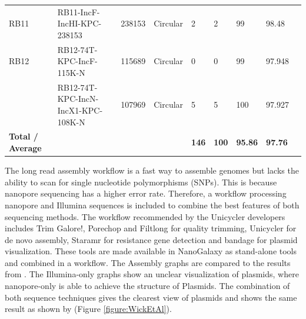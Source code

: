 \documentclass[a4paper,num-refs]{oup-contemporary}
\begin{document}
\begin{landscape}
\begin{table}
\begin{tabular}{l l l l l l l l l}
RB11                     & RB11-IncF-IncHI-KPC-238153         & 238153        & Circular            & 2                                & 2                                        & 99                & 98.48             &                   \\
RB12                     & RB12-74T-KPC-IncF-115K-N           & 115689        & Circular            & 0                                & 0                                        & 99                & 97.948            &                   \\
                         & RB12-74T-KPC-IncN-IncX1-KPC-108K-N & 107969        & Circular            & 5                                & 5                                        & 100               & 97.927            &                   \\
\midrule
\textbf{Total / Average} & \textbf{}                          & \textbf{}     & \textbf{}           & \textbf{146}                     & \textbf{100}                             & \textbf{95.86}    & \textbf{97.76}    & \textbf{}        \\
\bottomrule
\end{tabular}
\end{table}
\end{landscape}


The long read assembly workflow is a fast way to assemble genomes but lacks the ability to scan for single nucleotide polymorphisms (SNPs). This is because nanopore sequencing has a higher error rate. Therefore, a workflow processing nanopore and Illumina sequences is included to combine the best features of both sequencing methods. The workflow recommended by the Unicycler developers \cite{Wick2017} includes Trim Galore!, Porechop and Filtlong for quality trimming, Unicycler for de novo assembly, Staramr for resistance gene detection and bandage for plasmid visualization. These tools are made available in NanoGalaxy as stand-alone tools and combined in a workflow. The Assembly graphs are compared to the results from \citet{Wick2017}. The Illumina-only graphs show an unclear visualization of plasmids, where nanopore-only is able to achieve the structure of Plasmids. The combination of both sequence techniques gives the clearest view of plasmids and shows the same result as shown by \citet{Wick2017} (Figure \ref{figure:WickEtAl}).
\end{document}
